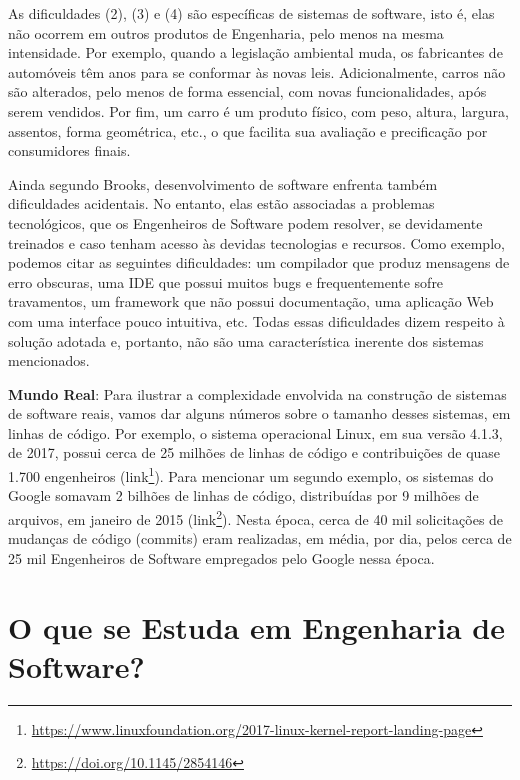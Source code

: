 \documentclass[
  11pt,
  twoside]{book}
\DeclareRobustCommand{\href}[2]{#2\footnote{\url{#1}}}
\newenvironment{esmbox}{\centering \vspace{1.5ex} \begin{tcolorbox}[breakable, colback=backcolor, width=4.9in]}{\end{tcolorbox} \vspace{1.5ex}}
\begin{document}
As dificuldades (2), (3) e (4) são específicas de sistemas de software,
isto é, elas não ocorrem em outros produtos de Engenharia, pelo menos na
mesma intensidade. Por exemplo, quando a legislação ambiental muda, os
fabricantes de automóveis têm anos para se conformar às novas leis.
Adicionalmente, carros não são alterados, pelo menos de forma essencial,
com novas funcionalidades, após serem vendidos. Por fim, um carro é um
produto físico, com peso, altura, largura, assentos, forma geométrica,
etc., o que facilita sua avaliação e precificação por consumidores
finais.

Ainda segundo Brooks, desenvolvimento de software enfrenta também
dificuldades acidentais. No entanto, elas estão associadas a problemas
tecnológicos, que os Engenheiros de Software podem resolver, se
devidamente treinados e caso tenham acesso às devidas tecnologias e
recursos. Como exemplo, podemos citar as seguintes dificuldades: um
compilador que produz mensagens de erro obscuras, uma IDE que possui
muitos bugs e frequentemente sofre travamentos, um framework que não
possui documentação, uma aplicação Web com uma interface pouco
intuitiva, etc. Todas essas dificuldades dizem respeito à solução
adotada e, portanto, não são uma característica inerente dos sistemas
mencionados.

 

\begin{esmbox}

\textbf{Mundo Real}: Para ilustrar a complexidade envolvida na
construção de sistemas de software reais, vamos dar alguns números sobre
o tamanho desses sistemas, em linhas de código. Por exemplo, o sistema
operacional Linux, em sua versão 4.1.3, de 2017, possui cerca de 25
milhões de linhas de código e contribuições de quase 1.700 engenheiros
(\href{https://www.linuxfoundation.org/2017-linux-kernel-report-landing-page}{link}).
Para mencionar um segundo exemplo, os sistemas do Google somavam 2
bilhões de linhas de código, distribuídas por 9 milhões de arquivos, em
janeiro de 2015 (\href{https://doi.org/10.1145/2854146}{link}). Nesta
época, cerca de 40 mil solicitações de mudanças de código (commits) eram
realizadas, em média, por dia, pelos cerca de 25 mil Engenheiros de
Software empregados pelo Google nessa época.

\end{esmbox}

\hypertarget{o-que-se-estuda-em-engenharia-de-software}{%
\section{O que se Estuda em Engenharia de
Software?}\label{o-que-se-estuda-em-engenharia-de-software}}
\end{document}
